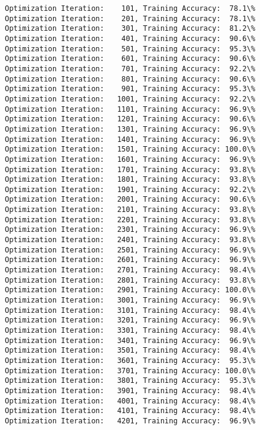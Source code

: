 \documentclass[11pt]{article}
\begin{document}
    \begin{Verbatim}[commandchars=\\\{\}]
Optimization Iteration:    101, Training Accuracy:  78.1\%
Optimization Iteration:    201, Training Accuracy:  78.1\%
Optimization Iteration:    301, Training Accuracy:  81.2\%
Optimization Iteration:    401, Training Accuracy:  90.6\%
Optimization Iteration:    501, Training Accuracy:  95.3\%
Optimization Iteration:    601, Training Accuracy:  90.6\%
Optimization Iteration:    701, Training Accuracy:  92.2\%
Optimization Iteration:    801, Training Accuracy:  90.6\%
Optimization Iteration:    901, Training Accuracy:  95.3\%
Optimization Iteration:   1001, Training Accuracy:  92.2\%
Optimization Iteration:   1101, Training Accuracy:  96.9\%
Optimization Iteration:   1201, Training Accuracy:  90.6\%
Optimization Iteration:   1301, Training Accuracy:  96.9\%
Optimization Iteration:   1401, Training Accuracy:  96.9\%
Optimization Iteration:   1501, Training Accuracy: 100.0\%
Optimization Iteration:   1601, Training Accuracy:  96.9\%
Optimization Iteration:   1701, Training Accuracy:  93.8\%
Optimization Iteration:   1801, Training Accuracy:  93.8\%
Optimization Iteration:   1901, Training Accuracy:  92.2\%
Optimization Iteration:   2001, Training Accuracy:  90.6\%
Optimization Iteration:   2101, Training Accuracy:  93.8\%
Optimization Iteration:   2201, Training Accuracy:  93.8\%
Optimization Iteration:   2301, Training Accuracy:  96.9\%
Optimization Iteration:   2401, Training Accuracy:  93.8\%
Optimization Iteration:   2501, Training Accuracy:  96.9\%
Optimization Iteration:   2601, Training Accuracy:  96.9\%
Optimization Iteration:   2701, Training Accuracy:  98.4\%
Optimization Iteration:   2801, Training Accuracy:  93.8\%
Optimization Iteration:   2901, Training Accuracy: 100.0\%
Optimization Iteration:   3001, Training Accuracy:  96.9\%
Optimization Iteration:   3101, Training Accuracy:  98.4\%
Optimization Iteration:   3201, Training Accuracy:  96.9\%
Optimization Iteration:   3301, Training Accuracy:  98.4\%
Optimization Iteration:   3401, Training Accuracy:  96.9\%
Optimization Iteration:   3501, Training Accuracy:  98.4\%
Optimization Iteration:   3601, Training Accuracy:  95.3\%
Optimization Iteration:   3701, Training Accuracy: 100.0\%
Optimization Iteration:   3801, Training Accuracy:  95.3\%
Optimization Iteration:   3901, Training Accuracy:  98.4\%
Optimization Iteration:   4001, Training Accuracy:  98.4\%
Optimization Iteration:   4101, Training Accuracy:  98.4\%
Optimization Iteration:   4201, Training Accuracy:  96.9\%

\end{Verbatim}
\end{document}
